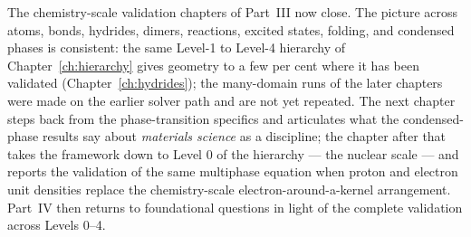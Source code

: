 The chemistry-scale validation chapters of Part~III now close. The picture across atoms, bonds, hydrides, dimers, reactions, excited states, folding, and condensed phases is consistent: the same Level-1 to Level-4 hierarchy of Chapter~\ref{ch:hierarchy} gives geometry to a few per cent where it has been validated (Chapter~\ref{ch:hydrides}); the many-domain runs of the later chapters were made on the earlier solver path and are not yet repeated. The next chapter steps back from the phase-transition specifics and articulates what the condensed-phase results say about \emph{materials science} as a discipline; the chapter after that takes the framework down to Level 0 of the hierarchy --- the nuclear scale --- and reports the validation of the same multiphase equation when proton and electron unit densities replace the chemistry-scale electron-around-a-kernel arrangement. Part~IV then returns to foundational questions in light of the complete validation across Levels 0--4.

